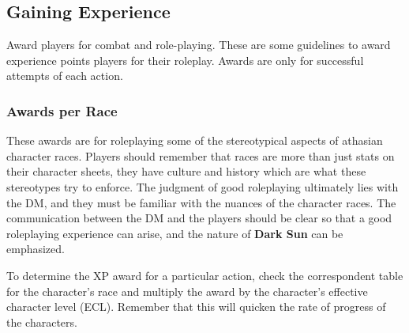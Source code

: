 
\subsection{Gaining Experience}
Award players for combat and role-playing. These are some guidelines to award experience points players for their roleplay. Awards are only for successful attempts of each action.

\subsubsection{Awards per Race}
These awards are for roleplaying some of the stereotypical aspects of athasian character races. Players should remember that races are more than just stats on their character sheets, they have culture and history which are what these stereotypes try to enforce. The judgment of good roleplaying ultimately lies with the DM, and they must be familiar with the nuances of the character races. The communication between the DM and the players should be clear so that a good roleplaying experience can arise, and the nature of \textbf{Dark Sun} can be emphasized.

To determine the XP award for a particular action, check the correspondent table for the character's race and multiply the award by the character's effective character level (ECL). Remember that this will quicken the rate of progress of the characters.

